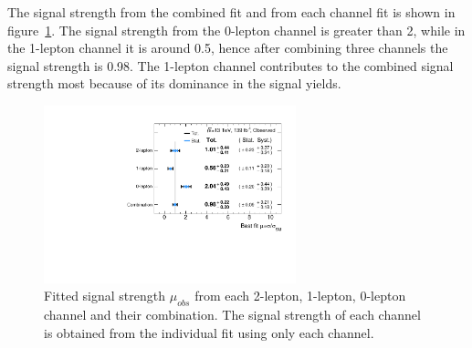 The signal strength from the combined fit and from each channel fit is shown in figure~\ref{fig:muhat}.
The signal strength from the 0-lepton channel is greater than 2, while in the 1-lepton channel it is around 0.5, hence after combining three channels the signal strength is 0.98.
The 1-lepton channel contributes to the combined signal strength most because of its dominance in the signal yields.
\begin{figure}[]
      \centering
        \includegraphics[width=0.65\textwidth]{figures/Muhat_channels}
        \caption{Fitted signal strength $\mu_{obs}$ from each 2-lepton, 1-lepton, 0-lepton channel and their combination. The signal strength of each channel is obtained from the individual fit using only each channel.}
       \label{fig:muhat}
\end{figure}
